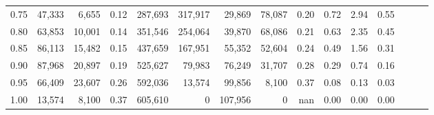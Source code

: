 \begin{tabular}{rrrrrrrrrrrrrrr}
0.75 &  47,333 &   6,655 &  0.12 &  287,693 &  317,917 &   29,869 &   78,087 &  0.20 &  0.72 &  2.94 &      0.55 \\
0.80 &  63,853 &  10,001 &  0.14 &  351,546 &  254,064 &   39,870 &   68,086 &  0.21 &  0.63 &  2.35 &      0.45 \\
0.85 &  86,113 &  15,482 &  0.15 &  437,659 &  167,951 &   55,352 &   52,604 &  0.24 &  0.49 &  1.56 &      0.31 \\
0.90 &  87,968 &  20,897 &  0.19 &  525,627 &   79,983 &   76,249 &   31,707 &  0.28 &  0.29 &  0.74 &      0.16 \\
0.95 &  66,409 &  23,607 &  0.26 &  592,036 &   13,574 &   99,856 &    8,100 &  0.37 &  0.08 &  0.13 &      0.03 \\
1.00 &  13,574 &   8,100 &  0.37 &  605,610 &        0 &  107,956 &        0 &   nan &  0.00 &  0.00 &      0.00 \\
\bottomrule
\end{tabular}
